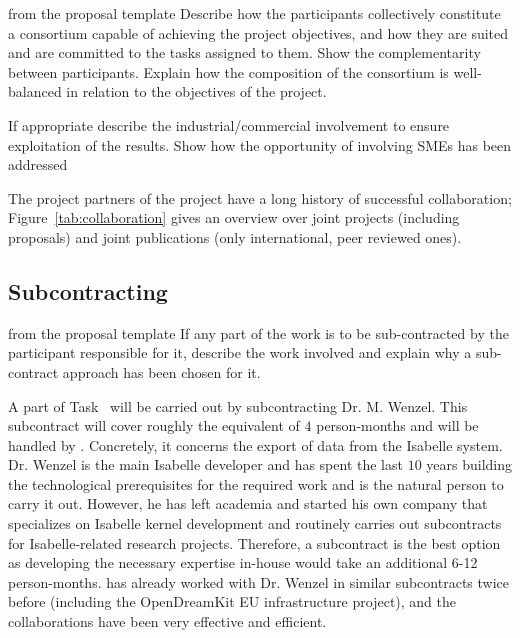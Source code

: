 \begin{todo}{from the proposal template}
  Describe how the participants collectively constitute a consortium capable of achieving
  the project objectives, and how they are suited and are committed to the tasks assigned
  to them. Show the complementarity between participants. Explain how the composition of
  the consortium is well-balanced in relation to the objectives of the project.  

  If appropriate describe the industrial/commercial involvement to ensure exploitation of
  the results. Show how the opportunity of involving SMEs has been addressed
\end{todo}

The project partners of the \pn project have a long history of successful collaboration;
Figure~\ref{tab:collaboration} gives an overview over joint projects (including proposals) and
joint publications (only international, peer reviewed ones).

% 
\coherencetable

\subsection{Subcontracting}\label{sec:subcontracting}

\begin{todo}{from the proposal template}
  If any part of the work is to be sub-contracted by the participant responsible for it,
  describe the work involved and explain why a sub-contract approach has been chosen for
  it.
\end{todo}

A part of Task~ will be carried out by subcontracting Dr. M. Wenzel.
This subcontract will cover roughly the equivalent of $4$ person-months and will be handled by .
Concretely, it concerns the export of data from the Isabelle system.
Dr. Wenzel is the main Isabelle developer and has spent the last $10$ years building the technological prerequisites for the required work and is the natural person to carry it out.
However, he has left academia and started his own company that specializes on Isabelle kernel development and routinely carries out subcontracts for Isabelle-related research projects.
Therefore, a subcontract is the best option as developing the necessary expertise in-house would take an additional 6-12 person-months.
 has already worked with Dr. Wenzel in similar subcontracts twice before (including the OpenDreamKit EU infrastructure project), and the collaborations have been very effective and efficient.


